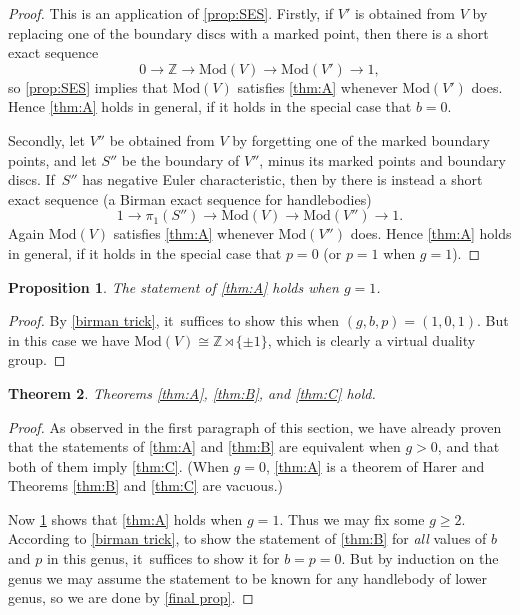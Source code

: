 \documentclass[JEP,XML,SOM,Unicode,NoFloatCountersInSection,published]{cedram}
\theoremstyle{plain}
\newtheorem{thm}{Theorem}[section]
\newtheorem{prop}[thm]{Proposition}
\theoremstyle{definition}
\newcommand{\Z}{\mathbb Z}
\newcommand{\hmod}{\mathrm{Mod}}
\begin{document}
\begin{proof}
This is an application of \cref{prop:SES}. Firstly, if $V'$ is obtained from $V$ by replacing one of the boundary discs with a marked point, then there is a short exact sequence
\[
0 \to \Z \to \hmod(V) \to \hmod(V')\to 1,
\]
so \cref{prop:SES} implies that $\hmod(V)$ satisfies \cref{thm:A} whenever $\hmod(V')$ does. Hence \cref{thm:A} holds in general, if it holds in the special case that $b=0$.

Secondly, let $V''$ be obtained from $V$ by forgetting one of the marked boundary points, and let $S''$ be the boundary of $V''$, minus its marked points and boundary discs. If~$S''$ has negative Euler characteristic, then by \cite[Lem.\,3.3]{hensel} there is instead a short exact sequence (a Birman exact sequence for handlebodies)
\[
1 \to \pi_1(S'') \to \hmod(V) \to \hmod(V'')\to 1.
\]
Again $\hmod(V)$ satisfies \cref{thm:A} whenever $\hmod(V'')$ does. Hence \cref{thm:A} holds in general, if it holds in the special case that $p=0$ (or $p=1$ when $g=1$).
\end{proof}

\begin{prop}\label{genus one}
The statement of \cref{thm:A} holds when $g=1$.
\end{prop}

\begin{proof}
By \cref{birman trick}, it~suffices to show this when $(g,b,p)=(1,0,1)$. But in this case we have $\hmod(V)\cong \Z \rtimes \{\pm 1\}$, which is clearly a virtual duality group.
\end{proof}

\begin{thm}
Theorems \ref{thm:A}, \ref{thm:B}, and \ref{thm:C} hold.
\end{thm}
\begin{proof}
As observed in the first paragraph of this section, we have already proven that the statements of \cref{thm:A} and \cref{thm:B} are equivalent when $g>0$, and that both of them imply \cref{thm:C}. (When $g=0$, \cref{thm:A} is a theorem of Harer and Theorems \ref{thm:B} and \ref{thm:C} are vacuous.)

Now \cref{genus one} shows that \cref{thm:A} holds when $g=1$. Thus we may fix some $g \geq 2$. According to \cref{birman trick}, to show the statement of \cref{thm:B} for \emph{all} values of $b$ and $p$ in this genus, it~suffices to show it for
$b=p=0$. But by induction on the genus we may assume the statement to be known for any handlebody of lower genus, so we are done by \cref{final prop}.
\end{proof}
\end{document}
